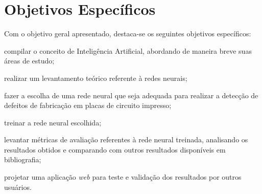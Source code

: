 \section{Objetivos Específicos}

Com o objetivo geral apresentado, destaca-se os seguintes objetivos específicos:

\begin{alineas}
  \item compilar o conceito de Inteligência Artificial, abordando de maneira breve suas áreas de estudo;
  \item realizar um levantamento teórico referente à redes neurais;
  \item fazer a escolha de uma rede neural que seja adequada para realizar  a detecção de defeitos de fabricação em placas de circuito impresso;
  \item treinar a rede neural escolhida;
  \item levantar métricas de avaliação referentes à rede neural treinada, analisando os resultados obtidos e comparando com outros resultados disponíveis em bibliografia;
  \item projetar uma aplicação \textit{web} para teste e validação dos resultados por outros usuários.
\end{alineas}
